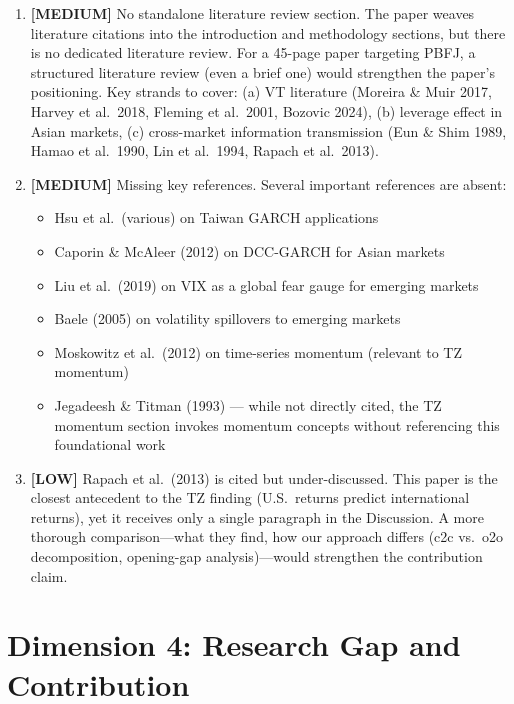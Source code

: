 \documentclass[12pt,a4paper]{article}
\newcommand{\MEDIUM}[1]{\textcolor{warncolor}{\textbf{[MEDIUM]} #1}}
\newcommand{\LOW}[1]{\textcolor{infocolor}{\textbf{[LOW]} #1}}
\begin{document}
\begin{enumerate}[leftmargin=2em]

\item \MEDIUM{No standalone literature review section.} The paper weaves literature citations into the introduction and methodology sections, but there is no dedicated literature review. For a 45-page paper targeting PBFJ, a structured literature review (even a brief one) would strengthen the paper's positioning. Key strands to cover: (a) VT literature (Moreira \& Muir 2017, Harvey et al.\ 2018, Fleming et al.\ 2001, Bozovic 2024), (b) leverage effect in Asian markets, (c) cross-market information transmission (Eun \& Shim 1989, Hamao et al.\ 1990, Lin et al.\ 1994, Rapach et al.\ 2013).

\item \MEDIUM{Missing key references.} Several important references are absent:
\begin{itemize}
\item Hsu et al.\ (various) on Taiwan GARCH applications
\item Caporin \& McAleer (2012) on DCC-GARCH for Asian markets
\item Liu et al.\ (2019) on VIX as a global fear gauge for emerging markets
\item Baele (2005) on volatility spillovers to emerging markets
\item Moskowitz et al.\ (2012) on time-series momentum (relevant to TZ momentum)
\item Jegadeesh \& Titman (1993) --- while not directly cited, the TZ momentum section invokes momentum concepts without referencing this foundational work
\end{itemize}

\item \LOW{Rapach et al.\ (2013) is cited but under-discussed.} This paper is the closest antecedent to the TZ finding (U.S.\ returns predict international returns), yet it receives only a single paragraph in the Discussion. A more thorough comparison---what they find, how our approach differs (c2c vs.\ o2o decomposition, opening-gap analysis)---would strengthen the contribution claim.

\end{enumerate}

\section{Dimension 4: Research Gap and Contribution}
\end{document}
